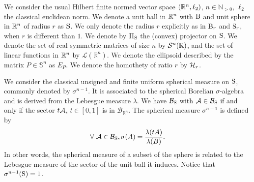 We consider the usual Hilbert finite normed vector space $(\mathbb{R}^n,\ell_2)$, $n \in \mathbb{N}_{> 0}$, $\ell_2$ the classical euclidean norm. We denote a unit ball in $\mathbb{R}^n$ with $\text{B}$ and unit sphere in $\mathbb{R}^n$ of radius $r$ as $\text{S}$. We only denote the radius $r$ explicitly as in $\text{B}_r$ and $\text{S}_r$, when $r$ is different than $1$. We denote by $\Pi_{\text{S}}$ the (convex) projector on $\text{S}$. We denote the set of real symmetric matrices of size $n$ by $\mathcal{S}^n(\mathbb{R})$, and the set of linear functions in $\mathbb{R}^n$ by $\mathcal{L}(\mathbb{R}^n)$. We denote the ellipsoid described by the matrix $P \in \mathbb{S}^n$ as $E_P$. We denote the homothety of ratio $r$ by $\mathcal{H}_{r}$. 


We consider the classical unsigned and finite uniform spherical measure on $\text{S}$, commonly denoted by $\sigma^{n-1}$. It is associated to the spherical Borelian $\sigma$-algebra and is derived from the Lebesgue measure $\lambda$. We have $\mathcal{B}_{\text{S}}$ with $\mathcal{A} \in \mathcal{B}_{\text{S}}$ if and only if the sector $t \mathcal{A}$, $t \in [0,1]$ is in $\mathcal{B}_{\mathbb{R}^n}$. The spherical measure $\sigma^{n-1}$ is defined by
$$\forall\ \mathcal{A} \in \mathcal{B}_{\text{S}}, \sigma(A) = \frac{\lambda(tA)}{\lambda(B)}. $$
In other words, the spherical measure of a subset of the sphere is related to the Lebesgue measure of the sector of the unit ball it induces. Notice that $\sigma^{n-1}(\text{S}) = 1$.

